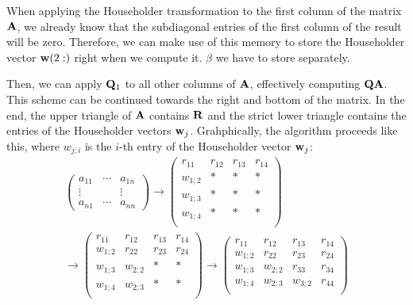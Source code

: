 \begin{intro}
  When applying the Householder transformation to the first column of
  the matrix $\mathbf A$, we already know that the subdiagonal entries of
  the first column of the result will be zero. Therefore, we can make
  use of this memory to store the Householder vector
  $\mathbf w(2:)$ right when we compute it. $\beta$ we have to store separately.

  Then, we can apply $\mathbf Q_1$ to all other columns of $\mathbf A$,
  effectively computing $\mathbf Q\mathbf A$. This scheme can be continued
  towards the right and bottom of the matrix. In the end, the upper
  triangle of $\mathbf A$ contains $\mathbf R$ and the strict lower triangle
  contains the entries of the Householder vectors
  $\mathbf w_j$. Grahphically, the algorithm proceeds like this, where
  $w_{j;i}$ is the $i$-th entry of the Householder vector $\mathbf w_j$:
  \begin{multline}
    \begin{pmatrix}
      a_{11} & \cdots &a_{1n}\\
      \vdots&&\vdots\\
      a_{n1}&\cdots&a_{nn}
    \end{pmatrix}
    \to
    \begin{pmatrix}
      r_{11} &r_{12} &r_{13} &r_{14} \\
      w_{1;2} & * & * & * \\
      w_{1;3} & * & *& * \\
      w_{1;4} & * & *& * \\
    \end{pmatrix}
    \\
    \to
    \begin{pmatrix}
      r_{11} &r_{12} &r_{13} &r_{14} \\
      w_{1;2} & r_{22} & r_{23} & r_{24} \\
      w_{1;3} & w_{2;2} & * & * \\
      w_{1;4} & w_{2;3} & *& * \\
    \end{pmatrix}
    \to
    \begin{pmatrix}
      r_{11} &r_{12} &r_{13} &r_{14} \\
      w_{1;2} & r_{22} & r_{23} & r_{24} \\
      w_{1;3} & w_{2;2} & r_{33} & r_{34} \\
      w_{1;4} & w_{2;3} & w_{3;2} & r_{44} \\
    \end{pmatrix}
  \end{multline}
\end{intro}

